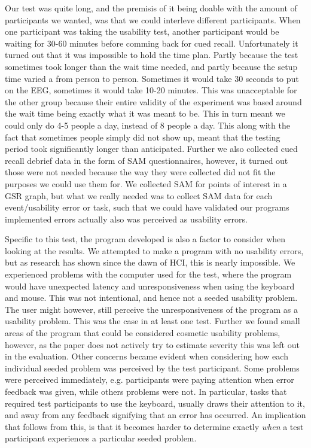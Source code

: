 Our test was quite long, and the premisis of it being doable with the amount of participants we wanted, was that we could interleve different participants. 
When one participant was taking the usability test, another participant would be waiting for 30-60 minutes before comming back for cued recall. 
Unfortunately it turned out that it was impossible to hold the time plan. Partly because the test sometimes took longer than the wait time needed, and partly because the setup time varied a from person to person. Sometimes it would take 30 seconds to put on the EEG, sometimes it would take 10-20 minutes. This was unacceptable for the other group because their entire validity of the experiment was based around the wait time being exactly what it was meant to be.
This in turn meant we could only do 4-5 people a day, instead of 8 people a day. 
This along with the fact that sometimes people simply did not show up, meant that the testing period took significantly longer than anticipated. 
Further we also collected cued recall debrief data in the form of SAM questionnaires, however, it turned out those were not needed because the way they were collected did not fit the purposes we could use them for. We collected SAM for points of interest in a GSR graph, but what we really needed was to collect SAM data for each event/usability error or task, such that we could have validated our programs implemented errors actually also was perceived as usability errors. 

Specific to this test, the program developed is also a factor to consider when looking at the results.  We attempted to
make a program with no usability errors, but as research has shown since the dawn of HCI, this is nearly impossible.  We
experienced problems with the computer used for the test, where the program would have unexpected latency and unresponsiveness when using the keyboard and mouse. This was not intentional, and hence not a seeded usability problem.
The user might however, still perceive the unresponsiveness of the program as a usability problem. 
This was the case in at least one test.  
Further we found small areas of the program that could be considered cosmetic usability problems, however, as the paper does not actively try
to estimate severity this was left out in the evaluation. Other concerns became evident when considering how each
individual seeded problem was perceived by the test participant. Some problems were perceived immediately,
e.g. participants were paying attention when error feedback was given, while others problems were not. In particular,
tasks that required test participants to use the keyboard, usually draws their attention to it, and away from any
feedback signifying that an error has occurred. An implication that follows from this, is that it becomes harder to
determine exactly \textit{when} a test participant experiences a particular seeded problem.\\

